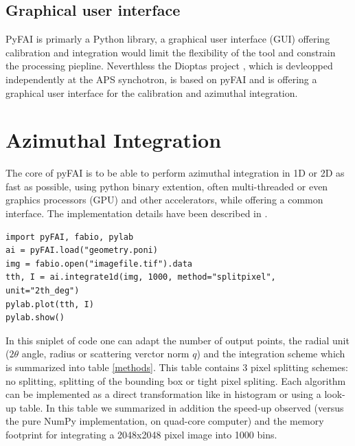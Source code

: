 \documentclass[preprint]{iucr}
\begin{document}
\subsection{Graphical user interface}
PyFAI is primarly a Python library, a graphical user interface (GUI) offering
calibration and integration would limit the flexibility of the tool and
constrain the processing piepline. 
Neverthless the Dioptas project 
\cite{diopas}, which is devleopped independently at the APS synchotron, is based
on pyFAI and is offering a graphical user interface for the calibration and
azimuthal integration.

\section{Azimuthal Integration}

The core of pyFAI is to be able to perform azimuthal integration in 1D or 2D as
fast as possible, using python binary extention, often multi-threaded or even
graphics processors (GPU) and other accelerators, while offering a common
interface. 
The implementation details have been described in
\cite{kieffer_ashiotis-proc-euroscipy-2014}.

\begin{verbatim}
import pyFAI, fabio, pylab
ai = pyFAI.load("geometry.poni)
img = fabio.open("imagefile.tif").data
tth, I = ai.integrate1d(img, 1000, method="splitpixel", unit="2th_deg")
pylab.plot(tth, I)
pylab.show()
\end{verbatim}
In this sniplet of code one can adapt the number of output points, 
the radial unit ($2\theta$ angle, radius or scattering verctor norm $q$) and the
integration scheme which is summarized into table \ref{methods}.
This table contains 3 pixel splitting schemes: no splitting, splitting of the
bounding box or tight pixel spliting. Each algorithm can be implemented as a
direct transformation like in histogram or using a look-up table.
In this table we summarized in addition the speed-up observed (versus the pure
NumPy \cite{numpy} implementation, on  quad-core computer) and the memory
footprint for integrating a 2048x2048 pixel image into 1000 bins.
\end{document}

